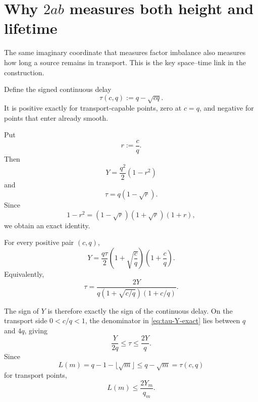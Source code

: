 \section{Why $2ab$ measures both height and lifetime}
\label{sec:lifetime-law}

The same imaginary coordinate that measures factor imbalance also measures how long a source remains in transport.  This is the key space--time link in the construction.

Define the signed continuous delay
\begin{equation}
 \tau(c,q):=q-\sqrt{cq}.
 \label{eq:tau}
\end{equation}
It is positive exactly for transport-capable points, zero at $c=q$, and negative for points that enter already smooth.

Put
\begin{equation}
 r:=\frac cq.
 \label{eq:r-ratio}
\end{equation}
Then
\begin{equation}
 Y=\frac{q^2}{2}(1-r^2)
 \label{eq:Y-r}
\end{equation}
and
\begin{equation}
 \tau=q(1-\sqrt r).
 \label{eq:tau-r}
\end{equation}
Since
\begin{equation}
 1-r^2=(1-\sqrt r)(1+\sqrt r)(1+r),
 \label{eq:factor-r}
\end{equation}
we obtain an exact identity.

\begin{theorem}
\label{thm:exact-height-lifetime}
For every positive pair $(c,q)$,
\begin{equation}
 \boxed{
 Y
 =
 \frac{q\tau}{2}
 \left(1+\sqrt{\frac cq}\right)
 \left(1+\frac cq\right).
 }
 \label{eq:Y-tau-exact}
\end{equation}
Equivalently,
\begin{equation}
 \boxed{
 \tau
 =
 \frac{2Y}
 {q\left(1+\sqrt{c/q}\right)\left(1+c/q\right)}.
 }
 \label{eq:tau-Y-exact}
\end{equation}
\end{theorem}

The sign of $Y$ is therefore exactly the sign of the continuous delay.  On the transport side $0<c/q<1$, the denominator in \cref{eq:tau-Y-exact} lies between $q$ and $4q$, giving
\begin{equation}
 \frac{Y}{2q}
 \le\tau
 \le\frac{2Y}{q}.
 \label{eq:tau-bounds}
\end{equation}
Since
\begin{equation}
 L(m)=q-1-\lfloor\sqrt m\rfloor
 \le q-\sqrt m=\tau(c,q)
 \label{eq:L-tau}
\end{equation}
for transport points,
\begin{equation}
 \boxed{L(m)\le\frac{2Y_m}{q_m}.}
 \label{eq:L-Y}
\end{equation}


